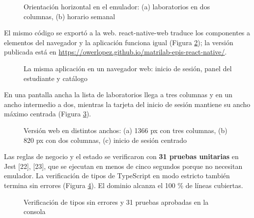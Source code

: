 \begin{figure}[!htbp]
\centering
{}
\caption{Orientación horizontal en el emulador: (a) laboratorios en dos columnas, (b) horario semanal}
\label{fig:horizontal}
\end{figure}

El mismo código se exportó a la web. react-native-web traduce los componentes a elementos del navegador y la aplicación funciona igual (Figura \ref{fig:web}); la versión publicada está en \url{https://owerlopez.github.io/matrilab-epis-react-native/}.

\begin{figure}[!htbp]
\centering
{}
\caption{La misma aplicación en un navegador web: inicio de sesión, panel del estudiante y catálogo}
\label{fig:web}
\end{figure}

En una pantalla ancha la lista de laboratorios llega a tres columnas y en un ancho intermedio a dos, mientras la tarjeta del inicio de sesión mantiene su ancho máximo centrada (Figura \ref{fig:web_ancha}).

\begin{figure}[!htbp]
\centering
{}
\caption{Versión web en distintos anchos: (a) 1366 px con tres columnas, (b) 820 px con dos columnas, (c) inicio de sesión centrado}
\label{fig:web_ancha}
\end{figure}

\vspace{0.2cm}

Las reglas de negocio y el estado se verificaron con \textbf{31 pruebas unitarias} en Jest [22], [23], que se ejecutan en menos de cinco segundos porque no necesitan emulador. La verificación de tipos de TypeScript en modo estricto también termina sin errores (Figura \ref{fig:pruebas}). El dominio alcanza el 100 \% de líneas cubiertas.

\begin{figure}[!htbp]
\centering
{}
\caption{Verificación de tipos sin errores y 31 pruebas aprobadas en la consola}
\label{fig:pruebas}
\end{figure}

